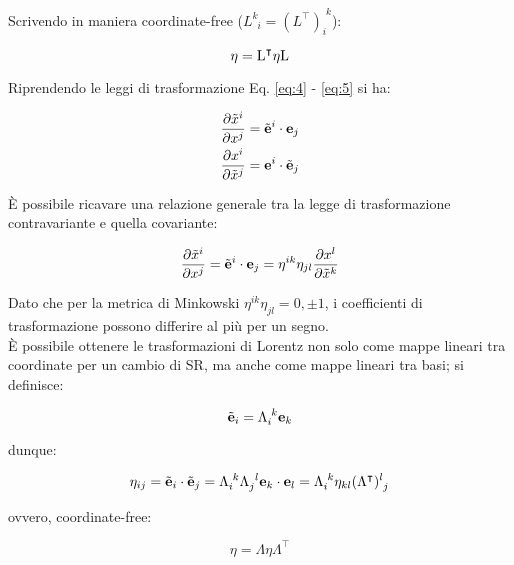 Scrivendo in maniera coordinate-free ($ L^k_{\,\,\,i} = (L^{\intercal})^{\,\,k}_i $):

\begin{equation}
	\eta = \mathbf{\text{L}}^{\intercal} \eta \mathbf{\text{L}}
	\label{eq:2.7}
\end{equation}

Riprendendo le leggi di trasformazione Eq. \ref{eq:4} - \ref{eq:5} si ha:

\begin{equation}
	\begin{split}
		\frac{\partial \tilde{x}^i}{\partial x^j} &= \tilde{\mathbf{e}}^i \cdot \mathbf{e}_j\\
		\frac{\partial x^i}{\partial \tilde{x}^j} &= \mathbf{e}^i \cdot \tilde{\mathbf{e}}_j
	\end{split}
	\label{eq:2.8}
\end{equation}

È possibile ricavare una relazione generale tra la legge di trasformazione contravariante e quella covariante:

\begin{equation}
	\frac{\partial \tilde{x}^i}{\partial x^j} = \tilde{\mathbf{e}}^i \cdot \mathbf{e}_j = \eta^{ik} \eta_{jl} \frac{\partial x^l}{\partial \tilde{x}^k}
	\label{eq:2.9}
\end{equation}

Dato che per la metrica di Minkowski $ \eta^{ik} \eta_{jl} = 0, \pm 1 $, i coefficienti di trasformazione possono differire al più per un segno.\\
È possibile ottenere le trasformazioni di Lorentz non solo come mappe lineari tra coordinate per un cambio di SR, ma anche come mappe lineari tra basi; si definisce:

\begin{equation}
	\tilde{\mathbf{e}}_i = \Lambda_{i}^{\,\,k} \mathbf{e}_k
	\label{eq:2.10}
\end{equation}

dunque:

\begin{equation}
	\eta_{ij} = \tilde{\mathbf{e}}_i \cdot \tilde{\mathbf{e}}_j = \Lambda_i^{\,\,k} \Lambda_j^{\,\,\,l} \mathbf{e}_k \cdot \mathbf{e}_l = \Lambda_i^{\,\,k} \eta_{kl} (\Lambda^{\intercal})_{\,\,j}^l
	\label{eq:2.11}
\end{equation}

ovvero, coordinate-free:

\begin{equation}
	\eta = \Lambda \eta \Lambda^{\intercal}
	\label{eq:2.12}
\end{equation}

